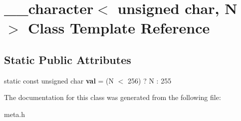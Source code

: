 \hypertarget{class____character_3_01unsigned_01char_00_01_n_01_4}{\section{\+\_\+\+\_\+character$<$ unsigned char, N $>$ Class Template Reference}
\label{class____character_3_01unsigned_01char_00_01_n_01_4}
}
\subsection*{Static Public Attributes}
\begin{DoxyCompactItemize}
\item 
\hypertarget{class____character_3_01unsigned_01char_00_01_n_01_4_a6e50fec7543218dac32c0762aca9a22c}{static const unsigned char {\bfseries val} = (N $<$ 256) ? N \+: 255}\label{class____character_3_01unsigned_01char_00_01_n_01_4_a6e50fec7543218dac32c0762aca9a22c}

\end{DoxyCompactItemize}


The documentation for this class was generated from the following file\+:\begin{DoxyCompactItemize}
\item 
meta.\+h\end{DoxyCompactItemize}
